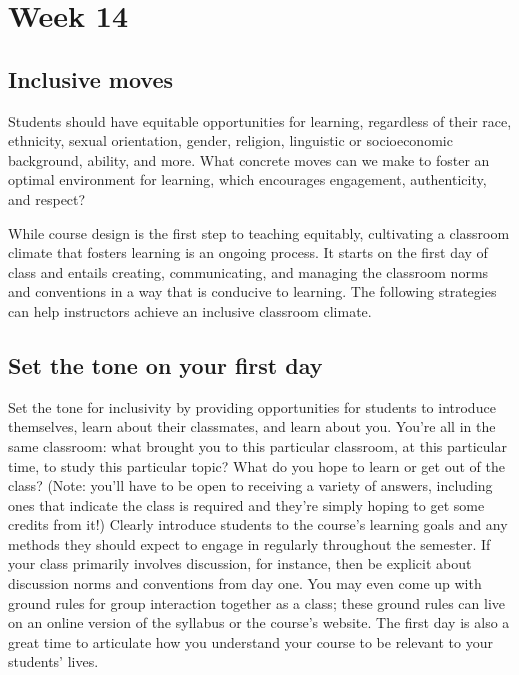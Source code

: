 \section{Week 14}
\label{sec:week-14}

\subsection{Inclusive moves}
\label{sec:inclusive-moves}

Students should have equitable opportunities for learning, regardless of their race, ethnicity, sexual orientation, gender, religion, linguistic or socioeconomic background, ability, and more. What concrete moves can we make to foster an optimal environment for learning, which encourages engagement, authenticity, and respect?

While course design is the first step to teaching equitably, cultivating a classroom climate that fosters learning is an ongoing process. It starts on the first day of class and entails creating, communicating, and managing the classroom norms and conventions in a way that is conducive to learning. The following strategies can help instructors achieve an inclusive classroom climate.

\subsection{Set the tone on your first day}
\label{sec:set-tone-your}

Set the tone for inclusivity by providing opportunities for students to introduce themselves, learn about their classmates, and learn about you. You’re all in the same classroom: what brought you to this particular classroom, at this particular time, to study this particular topic? What do you hope to learn or get out of the class? (Note: you’ll have to be open to receiving a variety of answers, including ones that indicate the class is required and they’re simply hoping to get some credits from it!) Clearly introduce students to the course’s learning goals and any methods they should expect to engage in regularly throughout the semester. If your class primarily involves discussion, for instance, then be explicit about discussion norms and conventions from day one. You may even come up with ground rules for group interaction together as a class; these ground rules can live on an online version of the syllabus or the course’s website. The first day is also a great time to articulate how you understand your course to be relevant to your students’ lives.

